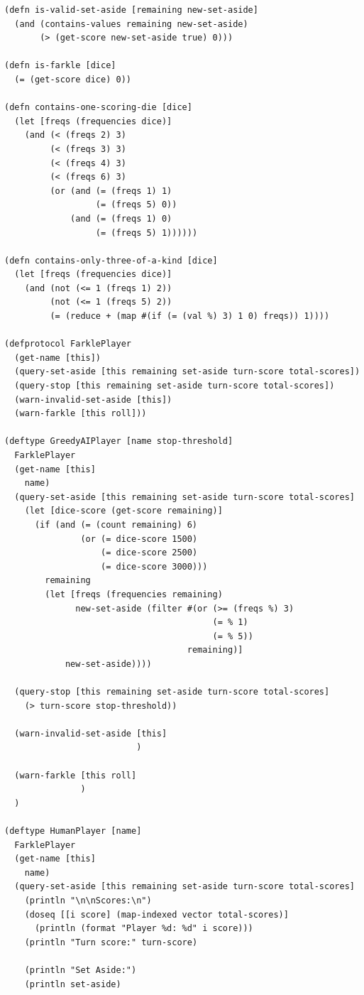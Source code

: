 \documentclass{article}
\begin{document}
\begin{lstlisting}
(defn is-valid-set-aside [remaining new-set-aside]
  (and (contains-values remaining new-set-aside)
       (> (get-score new-set-aside true) 0)))

(defn is-farkle [dice]
  (= (get-score dice) 0))

(defn contains-one-scoring-die [dice]
  (let [freqs (frequencies dice)]
    (and (< (freqs 2) 3)
         (< (freqs 3) 3)
         (< (freqs 4) 3)
         (< (freqs 6) 3)
         (or (and (= (freqs 1) 1)
                  (= (freqs 5) 0))
             (and (= (freqs 1) 0)
                  (= (freqs 5) 1))))))

(defn contains-only-three-of-a-kind [dice]
  (let [freqs (frequencies dice)]
    (and (not (<= 1 (freqs 1) 2))
         (not (<= 1 (freqs 5) 2))
         (= (reduce + (map #(if (= (val %) 3) 1 0) freqs)) 1))))

(defprotocol FarklePlayer
  (get-name [this])
  (query-set-aside [this remaining set-aside turn-score total-scores])
  (query-stop [this remaining set-aside turn-score total-scores])
  (warn-invalid-set-aside [this])
  (warn-farkle [this roll]))

(deftype GreedyAIPlayer [name stop-threshold]
  FarklePlayer
  (get-name [this]
    name)
  (query-set-aside [this remaining set-aside turn-score total-scores]
    (let [dice-score (get-score remaining)]
      (if (and (= (count remaining) 6)
               (or (= dice-score 1500)
                   (= dice-score 2500)
                   (= dice-score 3000)))
        remaining
        (let [freqs (frequencies remaining)
              new-set-aside (filter #(or (>= (freqs %) 3)
                                         (= % 1)
                                         (= % 5))
                                    remaining)]
            new-set-aside))))

  (query-stop [this remaining set-aside turn-score total-scores]
    (> turn-score stop-threshold))
    
  (warn-invalid-set-aside [this]
                          )

  (warn-farkle [this roll]
               )
  )

(deftype HumanPlayer [name]
  FarklePlayer
  (get-name [this]
    name)
  (query-set-aside [this remaining set-aside turn-score total-scores]
    (println "\n\nScores:\n")
    (doseq [[i score] (map-indexed vector total-scores)]
      (println (format "Player %d: %d" i score)))
    (println "Turn score:" turn-score)
    
    (println "Set Aside:")
    (println set-aside)
    

\end{lstlisting}
\end{document}

